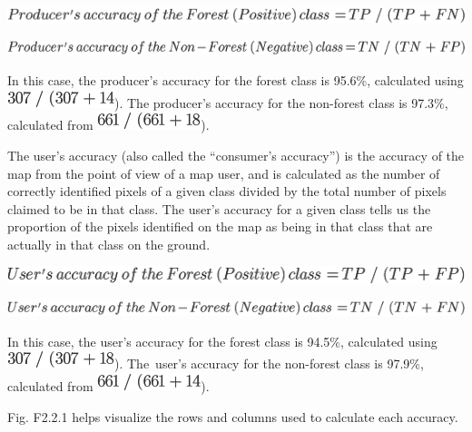\documentclass[
  letterpaper,
  DIV=11,
  numbers=noendperiod]{scrreprt}
\begin{document}
\includegraphics{./F2/image8.png}

\includegraphics{./F2/image9.png}

In this case, the producer's accuracy for the forest class is 95.6\%,
calculated using \includegraphics{./F2/image10.png}). The producer's
accuracy for the non-forest class is 97.3\%, calculated from
\includegraphics{./F2/image11.png}).

The user's accuracy (also called the ``consumer's accuracy'') is the
accuracy of the map from the point of view of a map user, and is
calculated as the number of correctly identified pixels of a given class
divided by the total number of pixels claimed to be in that class. The
user's accuracy for a given class tells us the proportion of the pixels
identified on the map as being in that class that are actually in that
class on the ground.

\includegraphics{./F2/image12.png}

\includegraphics{./F2/image13.png}

In this case, the user's accuracy for the forest class is 94.5\%,
calculated using \includegraphics{./F2/image14.png}). The~user's
accuracy for the non-forest class is 97.9\%, calculated from
\includegraphics{./F2/image15.png}).

Fig. F2.2.1 helps visualize the rows and columns used to calculate each
accuracy.
\end{document}
